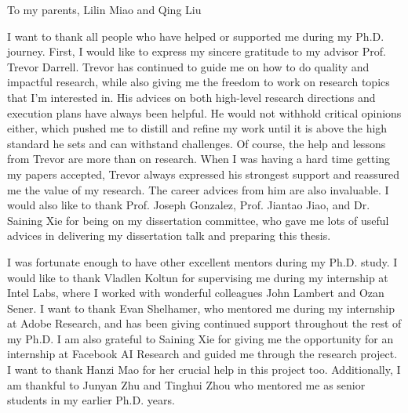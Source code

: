 \documentclass{ucbthesis}
\begin{document}
\begin{frontmatter}

\begin{dedication}
\null\vfil
\begin{center}
To my parents, Lilin Miao and Qing Liu
\end{center}
\vfil\null
\end{dedication}


\tableofcontents
\clearpage
\listoffigures
\clearpage
\listoftables

\begin{acknowledgements}
I want to thank all people who have helped or supported me during my Ph.D. journey. First, I would like to express my sincere gratitude to my advisor Prof. Trevor Darrell. Trevor has continued to guide me on how to do quality and impactful research, while also giving me the freedom to work on research topics that I'm interested in. His advices on both high-level research directions and execution plans have always been helpful. He would not withhold critical opinions either, which pushed me to distill and refine my work until it is above the high standard he sets and can withstand challenges. Of course, the help and lessons from Trevor are more than on research. When I was having a hard time getting my papers accepted, Trevor always expressed his strongest support and reassured me the value of my research. The career advices from him are also invaluable. I would also like to thank Prof. Joseph Gonzalez, Prof. Jiantao Jiao, and Dr. Saining Xie for being on my dissertation committee, who gave me lots of useful advices in delivering my dissertation talk and preparing this thesis.

I was fortunate enough to have other excellent mentors during my Ph.D. study. I would like to thank Vladlen Koltun for supervising me during my internship at Intel Labs, where I worked with wonderful colleagues John Lambert and Ozan Sener. I want to thank Evan Shelhamer, who mentored me during my internship at Adobe Research, and has been giving continued support throughout the rest of my Ph.D. I am also grateful to Saining Xie for giving me the opportunity for an internship at Facebook AI Research and guided me through the research project. I want to thank Hanzi Mao for her crucial help in this project too. Additionally, I am thankful to Junyan Zhu and Tinghui Zhou who mentored me as senior students in my earlier Ph.D. years. 


\end{acknowledgements}
\end{frontmatter}
\end{document}
